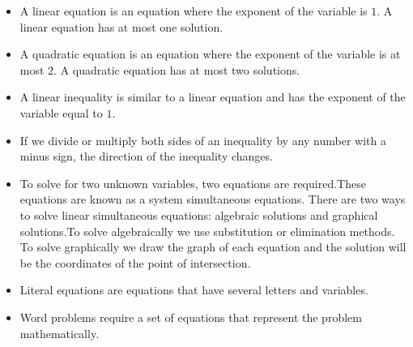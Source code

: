 
\begin{itemize}[noitemsep]
\item A linear equation is an equation where the exponent of the variable is $1$. A linear equation has at most one solution.
\item A quadratic equation is an equation where the exponent of the variable is at most $2$. A quadratic equation has at most two solutions.
\item A linear inequality is similar to a linear equation and has the exponent of the variable equal to $1$.
\item If we divide or multiply both sides of an inequality by any number with a minus sign, the direction of the inequality changes. 
\item To solve for two unknown variables, two equations are required.These equations are known as a system simultaneous equations. There are two ways to solve linear simultaneous equations: algebraic solutions and graphical solutions.To solve algebraically we use substitution or elimination methods. To solve graphically we draw the graph of each equation and the solution will be the coordinates of the point of intersection. 
\item Literal equations are equations that have several letters and variables.
\item Word problems require a set of equations that represent the problem mathematically. 
\end{itemize}

